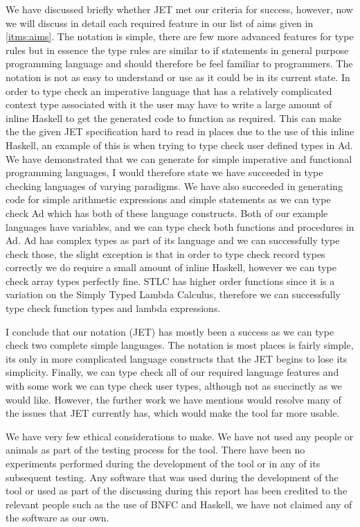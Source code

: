 We have discussed briefly whether JET met our criteria for success, however, now we will discuss in detail each required feature in our list of aims given in \autoref{itms:aims}.
The notation is simple, there are few more advanced features for type rules but in essence the type rules are similar to if statements in general purpose programming language and should therefore be feel familiar to programmers.
The notation is not as easy to understand or use as it could be in its current state.
In order to type check an imperative language that has a relatively complicated context type associated with it the user may have to write a large amount of inline Haskell to get the generated code to function as required.
This can make the the given JET specification hard to read in places due to the use of this inline Haskell, an example of this is when trying to type check user defined types in Ad.
We have demonstrated that we can generate for simple imperative and functional programming languages, I would therefore state we have succeeded in type checking languages of varying paradigms.
We have also succeeded in generating code for simple arithmetic expressions and simple statements as we can type check Ad which has both of these language constructs.
Both of our example languages have variables, and we can type check both functions and procedures in Ad.
Ad has complex types as part of its language and we can successfully type check those, the slight exception is that in order to type check record types correctly we do require a small amount of inline Haskell, however we can type check array types perfectly fine.
STLC has higher order functions since it is a variation on the Simply Typed Lambda Calculus, therefore we can successfully type check function types and lambda expressions.

I conclude that our notation (JET) has mostly been a success as we can type check two complete simple languages. 
The notation is most places is fairly simple, its only in more complicated language constructs that the JET begins to lose its simplicity.
Finally, we can type check all of our required language features and with some work we can type check user types, although not as succinctly as we would like.
However, the further work we have mentions would resolve many of the issues that JET currently has, which would make the tool far more usable.

We have very few ethical considerations to make.
We have not used any people or animals as part of the testing process for the tool.
There have been no experiments performed during the development of the tool or in any of its subsequent testing.
Any software that was used during the development of the tool or used as part of the discussing during this report has been credited to the relevant people such as the use of BNFC and Haskell, we have not claimed any of the software as our own.

